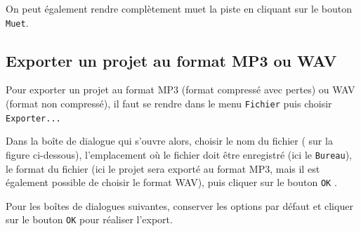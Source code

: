 On peut également rendre complètement muet la piste en cliquant sur le bouton \texttt{Muet}. 



\subsection{Exporter un projet au format MP3 ou WAV}\label{Son1export} 

Pour exporter un projet au format MP3 (format compressé avec pertes) ou WAV (format non compressé), il faut se rendre dans le menu \texttt{Fichier} puis choisir \texttt{Exporter...}

\vspace{6pt}

Dans la boîte de dialogue qui s'ouvre alors, choisir le nom du fichier ( sur la figure ci-dessous), l'emplacement où le fichier doit être enregistré  (ici le \texttt{Bureau}), le format du fichier  (ici le projet sera exporté au format MP3, mais il est également possible de choisir le format WAV), puis cliquer sur le bouton \texttt{OK} .       


Pour les boîtes de dialogues suivantes, conserver les options par défaut et cliquer sur le bouton \texttt{OK} pour réaliser l'export. 



